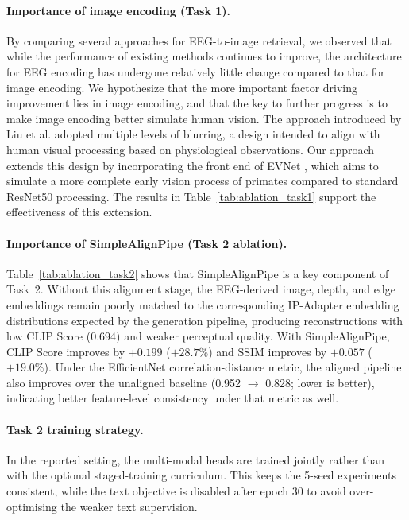 \documentclass[11pt]{article}
\begin{document}
\paragraph{Importance of image encoding (Task 1).}
By comparing several approaches \citep{atm2024, ccp2026, ved2026} for EEG-to-image retrieval, we observed that while the performance of existing methods continues to improve, the architecture for EEG encoding has undergone relatively little change compared to that for image encoding. We hypothesize that the more important factor driving improvement lies in image encoding, and that the key to further progress is to make image encoding better simulate human vision. The approach introduced by Liu et al. \citep{ved2026} adopted multiple levels of blurring, a design intended to align with human visual processing based on physiological observations. Our approach extends this design by incorporating the front end of EVNet \citep{evnet2025}, which aims to simulate a more complete early vision process of primates compared to standard ResNet50 processing. The results in Table~\ref{tab:ablation_task1} support the effectiveness of this extension.

\paragraph{Importance of SimpleAlignPipe (Task 2 ablation).}
Table~\ref{tab:ablation_task2} shows that SimpleAlignPipe is a key component of Task~2.
Without this alignment stage, the EEG-derived image, depth, and edge embeddings remain poorly matched to the corresponding IP-Adapter embedding distributions expected by the generation pipeline, producing reconstructions with low CLIP Score (0.694) and weaker perceptual quality.
With SimpleAlignPipe, CLIP Score improves by $+0.199$ ($+28.7\%$) and SSIM improves by $+0.057$ ($+19.0\%$).
Under the EfficientNet correlation-distance metric, the aligned pipeline also improves over the unaligned baseline (0.952 $\to$ 0.828; lower is better), indicating better feature-level consistency under that metric as well.

\paragraph{Task 2 training strategy.}
In the reported setting, the multi-modal heads are trained jointly rather than with the optional staged-training curriculum.
This keeps the 5-seed experiments consistent, while the text objective is disabled after epoch 30 to avoid over-optimising the weaker text supervision.
\end{document}
